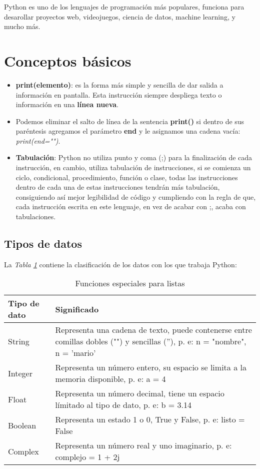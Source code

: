 
Python es uno de los lenguajes de programación más populares, funciona para desarollar proyectos web, videojuegos, ciencia de datos, machine learning, y mucho más.

\section{Conceptos básicos}
\begin{itemize}
	\item \textbf{print(elemento)}: es la forma más simple y sencilla de dar salida a información en pantalla. Esta instrucción siempre despliega texto o información en una \textbf{línea nueva}.
	\item Podemos eliminar el salto de línea de la sentencia \textbf{print()} si dentro de sus paréntesis agregamos el parámetro \textbf{end} y le asignamos una cadena vacía: \textit{print(end="")}.
	\item \textbf{Tabulación}: Python no utiliza punto y coma (;) para la finalización de cada instrucción, en cambio, utiliza tabulación de instrucciones, si se comienza un ciclo, condicional, procedimiento, función o clase, todas las instrucciones dentro de cada una de estas instrucciones tendrán más tabulación, consiguiendo así mejor legibilidad de código y cumpliendo con la regla de que, cada instrucción escrita en este lenguaje, en vez de acabar con ;, acaba con tabulaciones.
\end{itemize}


\subsection{Tipos de datos}
\hspace{0.55cm}La \textit{Tabla \ref{tab: 1}} contiene la clasificación de los datos con los que trabaja Python:
\begin{table}[H]
    \begin{center}
        \caption{Funciones especiales para listas}
        \label{tab: 1}
        \begin{tabular}{m{3cm}|m{10cm}}
            \hline
            \textbf{Tipo de dato} & \textbf{Significado} \\
            \hline
            String		& Representa una cadena de texto, puede contenerse entre comillas dobles ("") y sencillas (''), p. e: n = "nombre", n = 'mario' \\
            Integer		& Representa un número entero, su espacio se limita a la memoria disponible, p. e: a = 4 \\
            Float		& Representa un número decimal, tiene un espacio límitado al tipo de dato, p. e: b = 3.14 \\
            Boolean		& Representa un estado 1 o 0, True y False, p. e: listo = False \\
            Complex		& Representa un número real y uno imaginario, p. e: complejo = 1 + 2j \\
            \hline
        \end{tabular}
    \end{center}    
\end{table}


